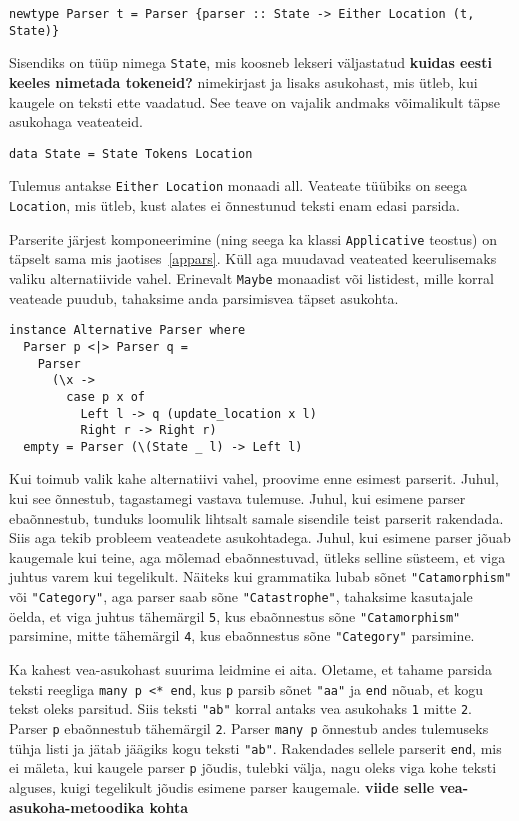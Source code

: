 \documentclass[12pt]{article}
\newcommand\markus[1]{\textcolor{roheline}{\textbf{#1}}}
\begin{document}
        \begin{verbatim}newtype Parser t = Parser {parser :: State -> Either Location (t, State)}\end{verbatim}

        Sisendiks on tüüp nimega \verb!State!, mis koosneb lekseri väljastatud \markus{kuidas eesti keeles nimetada tokeneid?} nimekirjast ja lisaks asukohast, mis ütleb, kui kaugele on teksti ette vaadatud. See teave on vajalik andmaks võimalikult täpse asukohaga veateateid.

        \begin{verbatim}data State = State Tokens Location\end{verbatim}

        Tulemus antakse \verb!Either Location! monaadi all. Veateate tüübiks on seega \verb!Location!, mis ütleb, kust alates ei õnnestunud teksti enam edasi parsida.

        Parserite järjest komponeerimine (ning seega ka klassi \verb!Applicative! teostus) on täpselt sama mis jaotises~\ref{appars}. Küll aga muudavad veateated keerulisemaks valiku alternatiivide vahel. Erinevalt \verb!Maybe! monaadist või listidest, mille korral veateade puudub, tahaksime anda parsimisvea täpset asukohta.

        \begin{verbatim}instance Alternative Parser where
  Parser p <|> Parser q =
    Parser
      (\x ->
        case p x of
          Left l -> q (update_location x l)
          Right r -> Right r)
  empty = Parser (\(State _ l) -> Left l)\end{verbatim}

      Kui toimub valik kahe alternatiivi vahel, proovime enne esimest parserit. Juhul, kui see õnnestub, tagastamegi vastava tulemuse. Juhul, kui esimene parser ebaõnnestub, tunduks loomulik lihtsalt samale sisendile teist parserit rakendada. Siis aga tekib probleem veateadete asukohtadega. Juhul, kui esimene parser jõuab kaugemale kui teine, aga mõlemad ebaõnnestuvad, ütleks selline süsteem, et viga juhtus varem kui tegelikult. Näiteks kui grammatika lubab sõnet \verb!"Catamorphism"! või \verb!"Category"!, aga parser saab sõne \verb!"Catastrophe"!, tahaksime kasutajale öelda, et viga juhtus tähemärgil \verb!5!, kus ebaõnnestus sõne \verb!"Catamorphism"! parsimine, mitte tähemärgil \verb!4!, kus ebaõnnestus sõne \verb!"Category"! parsimine.

      Ka kahest vea-asukohast suurima leidmine ei aita. Oletame, et tahame parsida teksti reegliga \verb!many p <* end!, kus \verb!p! parsib sõnet \verb!"aa"! ja \verb!end! nõuab, et kogu tekst oleks parsitud. Siis teksti \verb!"ab"! korral antaks vea asukohaks \verb!1! mitte \verb!2!. Parser \verb!p! ebaõnnestub tähemärgil \verb!2!. Parser \verb!many p! õnnestub andes tulemuseks tühja listi ja jätab jäägiks kogu teksti \verb!"ab"!. Rakendades sellele parserit \verb!end!, mis ei mäleta, kui kaugele parser \verb!p! jõudis, tulebki välja, nagu oleks viga kohe teksti alguses, kuigi tegelikult jõudis esimene parser kaugemale. \markus{viide selle vea-asukoha-metoodika kohta}
\end{document}
